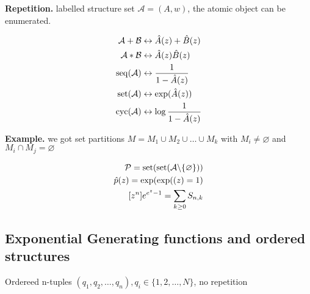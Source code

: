 


\textbf{Repetition.}
labelled structure set $\mathcal{A} = (A,w)$, the atomic object can be enumerated. 

\begin{align*}
  \mathcal{A}+\mathcal{B} &\leftrightarrow \hat{A}(z) + \hat{B}(z) \\
  \mathcal{A}*\mathcal{B} &\leftrightarrow \hat{A}(z) \hat{B}(z) \\
  \operatorname{seq}(\mathcal{A}) &\leftrightarrow \frac{1}{1 - \hat{A}(z)}\\
  \operatorname{set}(\mathcal{A}) &\leftrightarrow \exp(\hat{A}(z)) \\
  \operatorname{cyc}(\mathcal{A}) &\leftrightarrow \log \frac{1}{1 - \hat{A}(z)}\\
\end{align*}



\textbf{Example.}
we got set partitions $M = M_1 \cup M_2 \cup \ldots \cup M_k$ with $M_i \neq \varnothing$ and $M_i \cap M_j = \varnothing$

\begin{align*}
  \mathcal{P} = \operatorname{set}( \operatorname{set}( \mathcal{A} \backslash \{\varnothing\} )) \\
  \hat{p}(z) = \exp(\exp((z) = 1) \\
  [z^n] e^{e^z - 1} = \sum_{k\geq 0 } S_{n,k} \\
\end{align*}

\subsection{Exponential Generating functions and ordered structures}

Ordereed n-tuples $(q_1,q_2, \ldots, q_n), q_i \in \{1,2, \ldots, N\}$, no repetition

